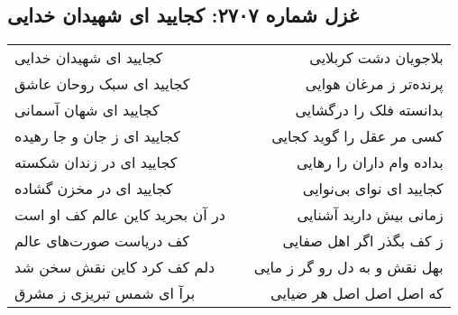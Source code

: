 \begin{center}
\section*{غزل شماره ۲۷۰۷: کجایید ای شهیدان خدایی}
\label{sec:2707}
\begin{longtable}{l p{0.5cm} r}
کجایید ای شهیدان خدایی
&&
بلاجویان دشت کربلایی
\\
کجایید ای سبک روحان عاشق
&&
پرنده‌تر ز مرغان هوایی
\\
کجایید ای شهان آسمانی
&&
بدانسته فلک را درگشایی
\\
کجایید ای ز جان و جا رهیده
&&
کسی مر عقل را گوید کجایی
\\
کجایید ای در زندان شکسته
&&
بداده وام داران را رهایی
\\
کجایید ای در مخزن گشاده
&&
کجایید ای نوای بی‌نوایی
\\
در آن بحرید کاین عالم کف او است
&&
زمانی بیش دارید آشنایی
\\
کف دریاست صورت‌های عالم
&&
ز کف بگذر اگر اهل صفایی
\\
دلم کف کرد کاین نقش سخن شد
&&
بهل نقش و به دل رو گر ز مایی
\\
برآ ای شمس تبریزی ز مشرق
&&
که اصل اصل اصل هر ضیایی
\\
\end{longtable}
\end{center}
